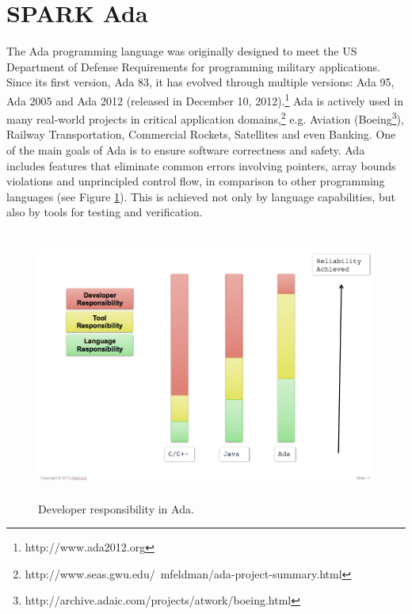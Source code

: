 \section{SPARK Ada}
\label{background:spark}


The Ada programming language was originally designed to meet the US Department of Defense Requirements for programming military applications. Since its first version, Ada 83, it has evolved through multiple versions: Ada 95, Ada 2005 and Ada 2012 (released in December 10, 2012).\footnote{http://www.ada2012.org} Ada is actively used in many real-world projects in critical application domains,\footnote{http://www.seas.gwu.edu/~mfeldman/ada-project-summary.html} e.g. Aviation (Boeing\footnote{http://archive.adaic.com/projects/atwork/boeing.html}), Railway Transportation, Commercial Rockets, Satellites and even Banking. One of the main goals of Ada is to ensure software correctness and safety. Ada includes features that eliminate common errors involving pointers, array bounds violations and unprincipled control flow, in comparison to other programming languages (see Figure \ref{figure:developer-responsibility-in-ada}). This is achieved not only by language capabilities, but also by tools for testing and verification. 

\begin{figure}[ht]%
    \begin{center}
    	\includegraphics[height=3.5in]{figures/developer_responsibility_in_ada.png}    	
    \end{center}
    \caption{Developer responsibility in Ada.\protect\footnotemark }
    \label{figure:developer-responsibility-in-ada}
\end{figure}

